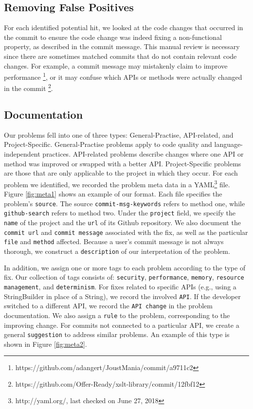 \documentclass[sigconf]{acmart}
\begin{document}
\subsection{Removing False Positives}

For each identified potential hit, we looked at the code changes that occurred in the commit to ensure the code change was indeed fixing a non-functional property, as described in the commit message. This manual review is necessary since there are sometimes matched commits that do not contain relevant code changes. For example, a commit message may mistakenly claim to improve performance \footnote{https://github.com/adangert/JoustMania/commit/a9711c2}, or it may confuse which APIs or methods were actually changed in the commit \footnote{https://github.com/Offer-Ready/xslt-library/commit/12fbf12}.

\subsection{Documentation} 
Our problems fell into one of three types: General-Practise, API-related, and Project-Specific. General-Practise problems apply to code quality and language-independent practices. API-related problems describe changes where one API or method was improved or swapped with a better API. Project-Specific problems are those that are only applicable to the project in which they occur.
For each problem we identified, we recorded the problem meta data in a YAML\footnote{http://yaml.org/, last checked on June 27, 2018} file. Figure \ref{fig:meta1} shows an example of our format. Each file specifies the problem's \texttt{source}. The source \texttt{commit-msg-keywords} refers to method one, while \texttt{github-search} refers to method two. Under the \texttt{project} field, we specify the \texttt{name} of the project and the \texttt{url} of its Github repository. We also document the \texttt{commit url} and \texttt{commit message} associated with the fix, as well as the particular \texttt{file} and \texttt{method} affected. Because a user's commit message is not always thorough, we construct a \texttt{description} of our interpretation of the problem.

In addition, we assign one or more tags to each problem according to the type of fix. Our collection of tags consists of: \texttt{security}, \texttt{performance}, \texttt{memory}, \texttt{resource management}, and \texttt{determinism}. For fixes related to specific APIs (e.g., using a StringBuilder in place of  a String), we record the involved \texttt{API}. If the developer switched to a different API, we record the \texttt{API change} in the problem documentation. We also assign a \texttt{rule} to the problem, corresponding to the improving change.  For commits not connected to a particular API, we create a general \texttt{suggestion} to address similar problems. An example of this type is shown in Figure \ref{fig:meta2}. 
\end{document}
